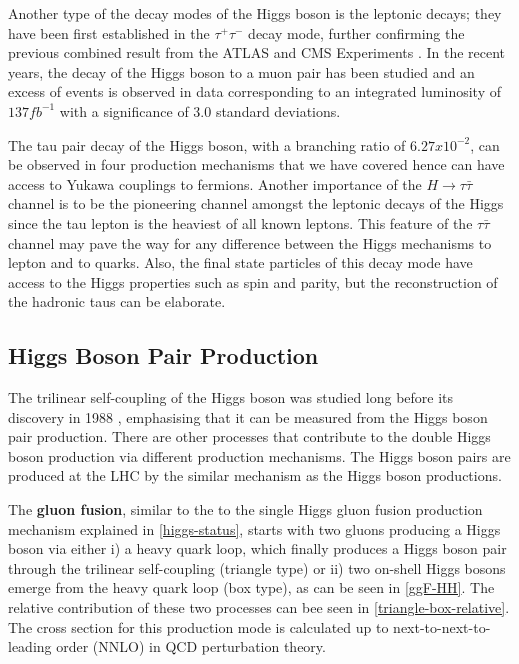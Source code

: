 Another type of the decay modes of the Higgs boson is the leptonic decays; they have been first established in the $\tau^+\tau^-$ decay mode\cite{CMS-PAS-HIG-16-043}, further confirming the previous combined result from the ATLAS and CMS Experiments \cite{Aad2016}. In the recent years, the decay of the Higgs boson to a muon pair has been studied and an excess of events is observed in data corresponding to an integrated luminosity of $137 fb^{-1}$ with a significance of 3.0 standard deviations\cite{CMS-PAS-HIG-19-006}.

The tau pair decay of the Higgs boson, with a branching ratio of $6.27x10^{-2}$, can be observed in four production mechanisms that we have covered hence can have access to Yukawa couplings to fermions. Another importance of the $H\rightarrow\tau\bar\tau$ channel is to be the pioneering channel amongst the leptonic decays of the Higgs since the tau lepton is the heaviest of all known leptons. This feature of the $\tau\bar\tau$ channel may pave the way for any difference between the Higgs mechanisms to lepton and to quarks. Also, the final state particles of this decay mode have access to the Higgs properties such as spin and parity, but the reconstruction of the hadronic taus can be elaborate. 

\subsection{Higgs Boson Pair Production}

The trilinear self-coupling of the Higgs boson was studied long before its discovery in 1988 \cite{GLOVER1988282}, emphasising that it can be measured from the Higgs boson pair production. There are other processes that contribute to the double Higgs boson production via different production mechanisms. The Higgs boson pairs are produced at the LHC by the similar mechanism as the Higgs boson productions. 

The \textbf{gluon fusion}, similar to the to the single Higgs gluon fusion production mechanism explained in \autoref{higgs-status}, starts with two gluons producing a Higgs boson via either i) a heavy quark loop, which finally produces a Higgs boson pair through the trilinear self-coupling (triangle type) or ii) two on-shell Higgs bosons emerge from the heavy quark loop (box type), as can be seen in \autoref{ggF-HH}. The relative contribution of these two processes can bee seen in \autoref{triangle-box-relative}. The cross section for this production mode is calculated up to next-to-next-to-leading order (NNLO) in QCD perturbation theory\cite{deFlorian2016}.

